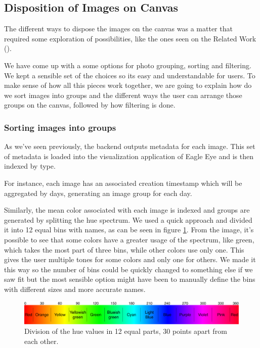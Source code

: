 \subsection{Disposition of Images on Canvas}
\label{sub:dispositions}

The different ways to dispose the images on the canvas was a matter that required some exploration of possibilities, like the ones seen on the Related Work (\cite{Bederson:2001:PZI:502348.502359,Bruls:2000p3517,Chen:1998p2344,Girgensohn:2010,Heesch:2004p2675,Hsu:2009p2696,Porta:2006p416,Rodden:2001p731,Schaefer:2010p1871,Strong:2009p413}).

We have come up with a some options for photo grouping, sorting and filtering. We kept a sensible set of the choices so its easy and understandable for users. 
To make sense of how all this pieces work together, we are going to explain how do we sort images into groups and the different ways the user can arrange those groups on the canvas, followed by how filtering is done.


\subsubsection{Sorting images into groups}

As we've seen previously, the backend outputs metadata for each image. This set of metadata is loaded into the visualization application of Eagle Eye and is then indexed by type.

For instance, each image has an associated creation timestamp which will be aggregated by days, generating an image group for each day.

Similarly, the mean color associated with each image is indexed and groups are generated by splitting the hue spectrum. We used a quick approach and divided it into 12 equal bins with names, as can be seen in figure \ref{fig:colorbins}. From the image, it's possible to see that some colors have a greater usage of the spectrum, like green, which takes the most part of three bins, while other colors use only one. This gives the user multiple tones for some colors and only one for others. We made it this way so the number of bins could be quickly changed to something else if we saw fit but the most sensible option might have been to manually define the bins with different sizes and more accurate names.

\begin{figure}[htbp]
	\centering
		\includegraphics[width=\linewidth]{Figures/colorbins}
	\caption{Division of the hue values in 12 equal parts, 30 points apart from each other.}
	\label{fig:colorbins}
\end{figure}

